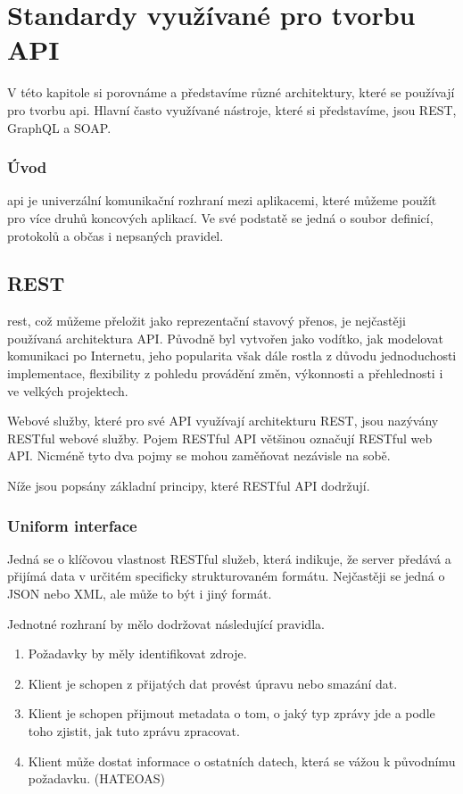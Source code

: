 \chapter{Standardy využívané pro tvorbu API}
V této kapitole si porovnáme a představíme různé architektury, které se používají pro tvorbu \gls{api}.
Hlavní často využívané nástroje, které si představíme, jsou REST, GraphQL a SOAP.

\subsection*{Úvod}
\gls{api} je univerzální komunikační rozhraní mezi aplikacemi, které můžeme použít pro více druhů koncových aplikací. Ve své podstatě se jedná o soubor definicí, protokolů a občas i nepsaných pravidel.

\section{REST}
\gls{rest}, což můžeme přeložit jako reprezentační stavový přenos, je nejčastěji používaná architektura API. Původně byl vytvořen jako vodítko, jak modelovat komunikaci po Internetu, jeho popularita však dále rostla z důvodu jednoduchosti implementace, flexibility z pohledu provádění změn, výkonnosti a přehlednosti i ve velkých projektech.

Webové služby, které pro své API využívají architekturu REST, jsou nazývány RESTful webové služby. Pojem RESTful API většinou označují RESTful web API. Nicméně tyto dva pojmy se mohou zaměňovat nezávisle na sobě.

Níže jsou popsány základní principy, které RESTful API dodržují.

\subsection{Uniform interface}
Jedná se o klíčovou vlastnost RESTful služeb, která indikuje, že server předává a přijímá data v určitém specificky strukturovaném formátu. Nejčastěji se jedná o JSON nebo XML, ale může to být i jiný formát.

Jednotné rozhraní by mělo dodržovat následující pravidla.\
\begin{enumerate}
    \item Požadavky by měly identifikovat zdroje.
    \item Klient je schopen z přijatých dat provést úpravu nebo smazání dat.
    \item Klient je schopen přijmout metadata o tom, o jaký typ zprávy jde a podle toho zjistit, jak tuto zprávu zpracovat.
    \item Klient může dostat informace o ostatních datech, která se vážou k původnímu požadavku. (HATEOAS)
\end{enumerate}

